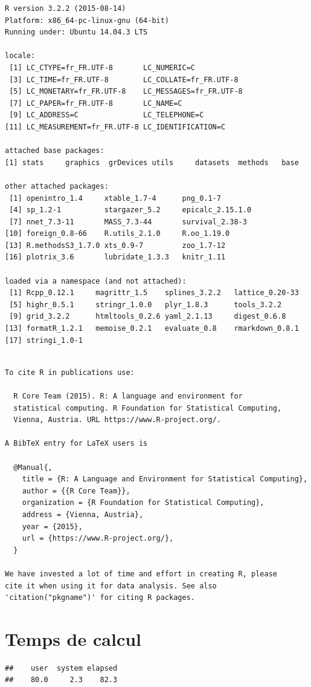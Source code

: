\documentclass[]{article}
\begin{document}
\begin{verbatim}
R version 3.2.2 (2015-08-14)
Platform: x86_64-pc-linux-gnu (64-bit)
Running under: Ubuntu 14.04.3 LTS

locale:
 [1] LC_CTYPE=fr_FR.UTF-8       LC_NUMERIC=C              
 [3] LC_TIME=fr_FR.UTF-8        LC_COLLATE=fr_FR.UTF-8    
 [5] LC_MONETARY=fr_FR.UTF-8    LC_MESSAGES=fr_FR.UTF-8   
 [7] LC_PAPER=fr_FR.UTF-8       LC_NAME=C                 
 [9] LC_ADDRESS=C               LC_TELEPHONE=C            
[11] LC_MEASUREMENT=fr_FR.UTF-8 LC_IDENTIFICATION=C       

attached base packages:
[1] stats     graphics  grDevices utils     datasets  methods   base     

other attached packages:
 [1] openintro_1.4     xtable_1.7-4      png_0.1-7        
 [4] sp_1.2-1          stargazer_5.2     epicalc_2.15.1.0 
 [7] nnet_7.3-11       MASS_7.3-44       survival_2.38-3  
[10] foreign_0.8-66    R.utils_2.1.0     R.oo_1.19.0      
[13] R.methodsS3_1.7.0 xts_0.9-7         zoo_1.7-12       
[16] plotrix_3.6       lubridate_1.3.3   knitr_1.11       

loaded via a namespace (and not attached):
 [1] Rcpp_0.12.1     magrittr_1.5    splines_3.2.2   lattice_0.20-33
 [5] highr_0.5.1     stringr_1.0.0   plyr_1.8.3      tools_3.2.2    
 [9] grid_3.2.2      htmltools_0.2.6 yaml_2.1.13     digest_0.6.8   
[13] formatR_1.2.1   memoise_0.2.1   evaluate_0.8    rmarkdown_0.8.1
[17] stringi_1.0-1  
\end{verbatim}

\begin{verbatim}

To cite R in publications use:

  R Core Team (2015). R: A language and environment for
  statistical computing. R Foundation for Statistical Computing,
  Vienna, Austria. URL https://www.R-project.org/.

A BibTeX entry for LaTeX users is

  @Manual{,
    title = {R: A Language and Environment for Statistical Computing},
    author = {{R Core Team}},
    organization = {R Foundation for Statistical Computing},
    address = {Vienna, Austria},
    year = {2015},
    url = {https://www.R-project.org/},
  }

We have invested a lot of time and effort in creating R, please
cite it when using it for data analysis. See also
'citation("pkgname")' for citing R packages.
\end{verbatim}

\section{Temps de calcul}\label{temps-de-calcul}

\begin{verbatim}
##    user  system elapsed 
##    80.0     2.3    82.3
\end{verbatim}
\end{document}
